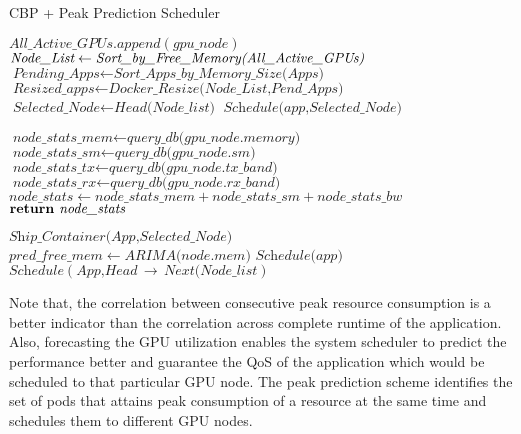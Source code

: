  


\begin{algorithm}
\caption{ CBP + Peak Prediction Scheduler}
\begin{algorithmic}[]
{}

\State$\textit{All\_Active\_GPUs.append}(\textit{gpu\_node})$
\EndIf
\EndFor
\State$\textit{Node\_List} \gets \textit{Sort\_by\_Free\_Memory(\textit{All\_Active\_GPUs})}$
\State$\textit{Pending\_Apps} \gets \textit{Sort\_Apps\_by\_Memory\_Size(Apps)}$
\State$\textit{Resized\_apps} \gets \textit{Docker\_Resize(Node\_List,Pend\_Apps)}$
\State$\textit{Selected\_Node} \gets \textit{Head(Node\_list)}$
\State$\textit{Schedule(app,Selected\_Node)}$
\EndFor
{}

\State$\textit{node\_stats\_mem} \gets \textit{query\_db(gpu\_node.memory)}$
\State$\textit{node\_stats\_sm} \gets\textit{query\_db(gpu\_node.sm)}$
\State$\textit{node\_stats\_tx} \gets\textit{query\_db(gpu\_node.tx\_band)}$
\State$\textit{node\_stats\_rx} \gets\textit{query\_db(gpu\_node.rx\_band)}$
\State$\textit{node\_stats} \gets \textit{node\_stats\_mem} + \textit{node\_stats\_sm} + \textit{node\_stats\_bw}$
\State$\Return \textit{   node\_stats}$
\EndProcedure

\State$\textit{Ship\_Container(App,Selected\_Node)}$
\Else{}\\

 
\State$ \textit{pred\_free\_mem} \gets \textit{ARIMA(node$.$mem)}$
\State$\textit{Schedule(app)}$
\Else{}
\State$\textit{Schedule}(\textit{App,Head$\,\to\,$Next(Node\_list})$
\EndIf
\EndIf
\EndIf
\EndProcedure
\end{algorithmic}
\label{algo}
\end{algorithm}



Note that, the correlation between consecutive peak resource consumption is a better indicator than the correlation across complete runtime of the application. Also, forecasting the GPU utilization enables the system scheduler to predict the performance better and guarantee the QoS of the application which would be scheduled to that particular GPU node. The peak prediction scheme identifies the set of pods that attains peak consumption of a resource at the same time and schedules them to different GPU nodes.

